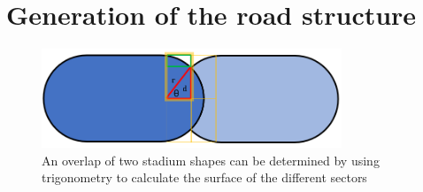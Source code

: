 \chapter{Generation of the road structure}
\label{app:appendix_a}

\graphicspath{{appendix_a/figures/}} %
 \begin{figure}
\centering
    \includegraphics[width=0.8\textwidth]{appendix_a/figures/calsurface.PNG}
   \caption{An overlap of two stadium shapes can be determined by using trigonometry to calculate the surface of the different sectors}
   \end{figure}
  
